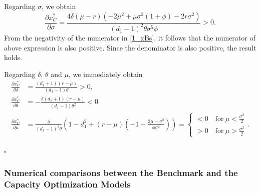 Regarding $\sigma$, we obtain
$$\frac{\partial x^*_C}{\partial \sigma}=\frac{4 \delta  (\mu -r) \left(-2 \mu ^2+\mu  \sigma ^2 (1+\phi)-2 r \sigma ^2\right)}{(d_1-1)^2 \theta  \sigma ^5 \phi}>0.$$
From the negativity of the numerator in  \eqref{1_xBs}, it follows that the numerator of above expression is also positive. Since the denominator is also positive, the result holds.

Regarding $\delta$, $\theta$ and $\mu$, we immediately obtain 
\begin{align*}
\frac{\partial x^*_C}{\partial \delta}&=\frac{(d_1+1) (r-\mu )}{(d_1-1) \theta }>0,\\
\frac{\partial x^*_C}{\partial \theta}&=-\frac{\delta  (d_1+1) (r-\mu )}{(d_1-1) \theta^2}<0\\
\frac{\partial x^*_C}{\partial \mu}&=\frac{\delta}{(d_1-1)^2 \theta} \left( 1-d_1^2 +(r-\mu)\left(-1+\frac{2\mu-\sigma^2}{\phi \sigma^2} \right) \right)= \begin{cases}
<0 \quad \text{for} \ \mu<\frac{\sigma^2}{2}\\
>0 \quad \text{for} \ \mu>\frac{\sigma^2}{2}
\end{cases}.
\end{align*}

\begin{flushright}
 $\square$
\end{flushright}


\subsubsection{Numerical comparisons between the Benchmark and the Capacity Optimization Models}


